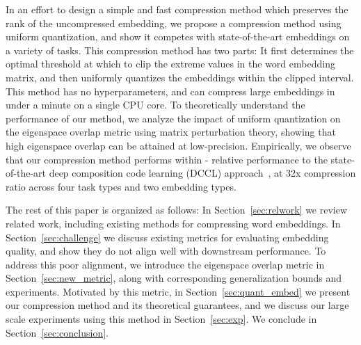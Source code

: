 In an effort to design a simple and fast compression method which preserves the rank of the uncompressed embedding, we propose a compression method using uniform quantization, and show it competes with state-of-the-art embeddings on a variety of tasks.
This compression method has two parts: It first determines the optimal threshold at which to clip the extreme values in the word embedding matrix, and then uniformly quantizes the embeddings within the clipped interval.
This method has no hyperparameters, and can compress large embeddings in under a minute on a single CPU core.
To theoretically understand the performance of our method, we analyze the impact of uniform quantization on the eigenspace overlap metric using matrix perturbation theory, showing that high eigenspace overlap can be attained at low-precision.
Empirically, we observe that our compression method performs within - relative performance to the state-of-the-art deep composition code learning (DCCL) approach~\citep{dccl17}, at 32x compression ratio across four task types and two embedding types.

The rest of this paper is organized as follows:
In Section~\ref{sec:relwork} we review related work, including existing methods for compressing word embeddings.
In Section~\ref{sec:challenge} we discuss existing metrics for evaluating embedding quality, and show they do not align well with downstream performance.
To address this poor alignment, we introduce the eigenspace overlap metric in Section~\ref{sec:new_metric}, along with corresponding generalization bounds and experiments.
Motivated by this metric, in Section~\ref{sec:quant_embed} we present our compression method and its theoretical guarantees, and we discuss our large scale experiments using this method in Section~\ref{sec:exp}.
We conclude in Section~\ref{sec:conclusion}.


